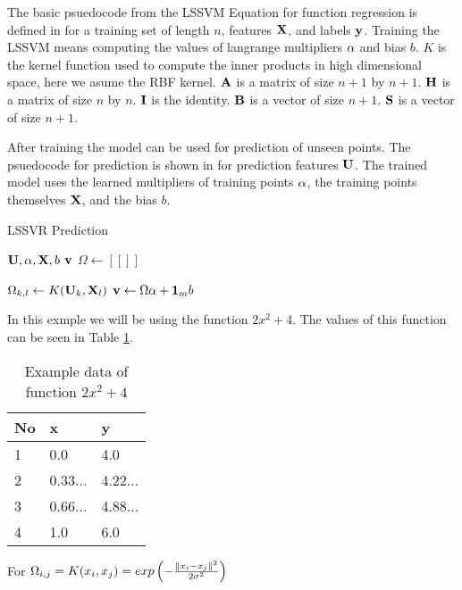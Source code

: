 The basic psuedocode from the LSSVM Equation for function regression is defined in  for a training set of length $n$, features $\vb{X}$, and labels $\vb{y}$. Training the LSSVM means computing the values of langrange multipliers $\vb{\alpha}$ and bias $b$. $K$ is the kernel function used to compute the inner products in high dimensional space, here we asume the RBF kernel. $\vb{A}$ is a matrix of size $n+1$ by $n+1$. $\vb{H}$ is a matrix of size $n$ by $n$. $\vb{I}$ is the identity. $\vb{B}$ is a vector of size $n+1$. $\vb{S}$ is a vector of size $n+1$.

After training the model can be used for prediction of unseen points. The psuedocode for prediction is shown in  for prediction features $\vb{U}$. The trained model uses the learned multipliers of training points $\vb{\alpha}$, the training points themselves $\vb{X}$, and the bias $b$.

\begin{algorithm}[H]
        \caption{LSSVR Prediction}\label{alg2:cap}
        \begin{algorithmic}[1]
                \Require $\vb{U}, \vb{\alpha}, \vb{X}, b$
                \Ensure $\vb{v}$
                \State $\Omega \gets [[]]$ 

                \State$\Omega_{k,l}\gets K(\vb{U}_{k},\vb{X}_l)$
                \EndFor
                \EndFor
                \State $\vb{v} \gets \Omega\vb{\alpha} + \vb{1}_{m}b$
        \end{algorithmic}
\end{algorithm}

In this exmple we will be using the function $2x^2+4$. The values of this function can be seen in Table \ref{table:1}.

\begin{table}[H]
        \centering
        \begin{tabular}{@{}lll@{}}
                \toprule
                No & x       & y       \\ \midrule
                1  & 0.0     & 4.0     \\
                2  & 0.33... & 4.22... \\
                3  & 0.66... & 4.88... \\
                4  & 1.0     & 6.0     \\
                \bottomrule
        \end{tabular}
        \caption{Example data of function $2x^2+4$} \label{table:1}
\end{table}
For $\Omega_{i,j}=K(x_i,x_j)=exp \left(-\frac{\norm*{x_i-x_j}^2}{2\sigma^2}\right)$

